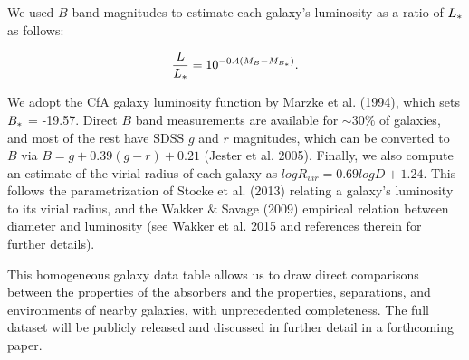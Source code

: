 \documentclass[iop]{emulateapj-rtx4}
\begin{document}
We used $B$-band magnitudes to estimate each galaxy's luminosity as a ratio of $L_{\**}$ as follows:

\begin{equation}
	\frac{L}{L_{\**}} = 10^{-0.4 (M_{B} - M_{B_{\**}})}. 
\end{equation}

We adopt the CfA galaxy luminosity function by Marzke et al. (1994), which sets $B_{\**} $ = -19.57. Direct $B$ band measurements are available for $\sim 30\%$ of galaxies, and most of the rest have SDSS $g$ and $r$ magnitudes, which can be converted to $B$ via $B = g + 0.39 (g-r) + 0.21$ (Jester et al. 2005). Finally, we also compute an estimate of the virial radius of each galaxy as $log R_{vir} = 0.69 log D + 1.24$. This follows the parametrization of Stocke et al. (2013) relating a galaxy's luminosity to its virial radius, and the Wakker $\&$ Savage (2009) empirical relation between diameter and luminosity (see Wakker et al. 2015 and references therein for further details).

This homogeneous galaxy data table allows us to draw direct comparisons between the properties of the absorbers and the properties, separations, and environments of nearby galaxies, with unprecedented completeness. The full dataset will be publicly released and discussed in further detail in a forthcoming paper.
\end{document}
